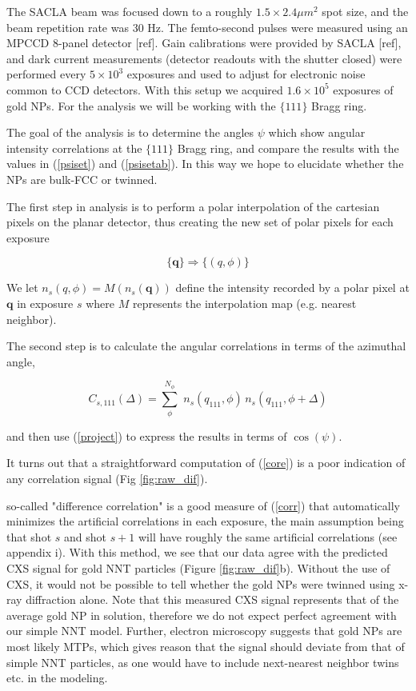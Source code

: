 \documentclass [11pt,fleqn]{article}
\def \be {\begin{equation}}
\def \ee {\end{equation}}
\begin{document}
The SACLA beam was focused down to a roughly $1.5 \times 2.4 \mu m ^2$ spot size, and the beam repetition rate was 30 Hz. The femto-second pulses were measured using an MPCCD 8-panel detector [ref]. Gain calibrations were provided by SACLA [ref], and dark current measurements (detector readouts with the shutter closed) were performed every $5\times 10^3$ exposures and used to adjust for electronic noise common to CCD detectors. With this setup we acquired $1.6\times 10^5$ exposures of gold NPs. For the analysis we will be working with the $\{111\}$ Bragg ring.

The goal of the analysis is to determine the angles $\psi$ which show angular intensity correlations at the $\{111\}$ Bragg ring, and compare the results with the values in (\ref{psiset}) and (\ref{psisetab}). In this way we hope to elucidate whether the NPs are bulk-FCC or twinned.

The first step in analysis is to perform a polar interpolation of the cartesian pixels on the planar detector, thus creating the new set of polar pixels for each exposure

\be
\{\bm q\} \Rightarrow \{ (q,\phi) \}
\ee

We let $n_s(q,\phi) = M(n_s(\bm q))$ define the intensity recorded by a polar pixel at $\bm q$ in exposure $s$ where $M$ represents the interpolation map (e.g. nearest neighbor). 

The second step is to calculate the angular correlations in terms of the azimuthal angle, 

\be \label{cor111}
C_{s,111}(\Delta) = \sum_{\phi}^{N_\phi}\,\, n_s(q_{111},\phi)\, n_s(q_{111}, \phi+\Delta)
\ee

and then use (\ref{project}) to express the results in terms of $\cos(\psi)$.

It turns out that a straightforward computation of (\ref{core}) is a poor indication of any correlation signal (Fig \ref{fig:raw_dif}).  

so-called "difference correlation" is a good measure of (\ref{corr}) that automatically minimizes the artificial correlations in each exposure, the main assumption being that shot $s$ and shot $s+1$ will have roughly the same artificial correlations (see appendix i). With this method, we see that our data agree with the predicted CXS signal for gold NNT particles (Figure \ref{fig:raw_dif}b). Without the use of CXS, it would not be possible to tell whether the gold NPs were twinned using x-ray diffraction alone. Note that this measured CXS signal represents that of the average gold NP in solution, therefore we do not expect perfect agreement with our simple NNT model. Further, electron microscopy suggests that gold NPs are most likely MTPs, which gives reason that the signal should deviate from that of simple NNT particles, as one would have to include next-nearest neighbor twins etc. in the modeling.
\end{document}
